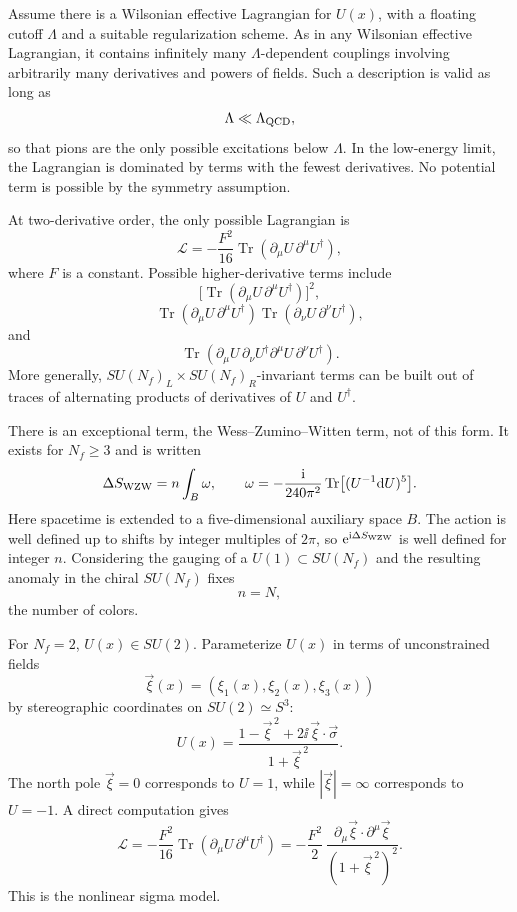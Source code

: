 Assume there is a Wilsonian effective Lagrangian for \(U(x)\), with a
floating cutoff \(\Lambda\) and a suitable regularization scheme.  As in
any Wilsonian effective Lagrangian, it contains infinitely many
\(\Lambda\)-dependent couplings involving arbitrarily many derivatives
and powers of fields.  Such a description is valid as long as
\[
  \Lambda\ll\Lambda_{\rm QCD},
\]
so that pions are the only possible excitations below \(\Lambda\).  In
the low-energy limit, the Lagrangian is dominated by terms with the
fewest derivatives.  No potential term is possible by the symmetry
assumption.

At two-derivative order, the only possible Lagrangian is
\[
  \mathcal L
  =
  -\frac{F^2}{16}
  \operatorname{Tr}(\partial_\mu U\,\partial^\mu U^\dagger),
\]
where \(F\) is a constant.  Possible higher-derivative terms include
\[
  \bigl[
    \operatorname{Tr}(\partial_\mu U\,\partial^\mu U^\dagger)
  \bigr]^2,
\]
\[
  \operatorname{Tr}(\partial_\mu U\,\partial^\mu U^\dagger)
  \operatorname{Tr}(\partial_\nu U\,\partial^\nu U^\dagger),
\]
and
\[
  \operatorname{Tr}(
    \partial_\mu U\,\partial_\nu U^\dagger
    \partial^\mu U\,\partial^\nu U^\dagger).
\]
More generally, \(SU(N_f)_L\times SU(N_f)_R\)-invariant terms can be
built out of traces of alternating products of derivatives of \(U\) and
\(U^\dagger\).

There is an exceptional term, the Wess--Zumino--Witten term, not of this
form.  It exists for \(N_f\ge3\) and is written
\[
  \Delta S_{\rm WZW}=n\int_B\omega,
  \qquad
  \omega=-\frac{\mathrm{i}}{240\pi^2}
  \operatorname{Tr}\bigl[(U^{-1}\mathrm{d} U)^5\bigr].
\]
Here spacetime is extended to a five-dimensional auxiliary space \(B\).
The action is well defined up to shifts by integer multiples of \(2\pi\),
so \(\mathrm{e}^{\mathrm{i}\Delta S_{\rm WZW}}\) is well defined for integer \(n\).
Considering the gauging of a \(U(1)\subset SU(N_f)\) and the resulting
anomaly in the chiral \(SU(N_f)\) fixes
\[
  n=N,
\]
the number of colors.

For \(N_f=2\), \(U(x)\in SU(2)\).  Parameterize \(U(x)\) in terms of
unconstrained fields
\[
  \vec\xi(x)=(\xi_1(x),\xi_2(x),\xi_3(x))
\]
by stereographic coordinates on \(SU(2)\simeq S^3\):
\[
  U(x)
  =
  \frac{1-\vec\xi^{\,2}+2\ii\,\vec\xi\cdot\vec\sigma}
       {1+\vec\xi^{\,2}}.
\]
The north pole \(\vec\xi=0\) corresponds to \(U=1\), while
\(|\vec\xi|=\infty\) corresponds to \(U=-1\).  A direct computation gives
\[
  \mathcal L
  =
  -\frac{F^2}{16}
  \operatorname{Tr}(\partial_\mu U\,\partial^\mu U^\dagger)
  =
  -\frac{F^2}{2}\,
  \frac{\partial_\mu\vec\xi\cdot\partial^\mu\vec\xi}
       {(1+\vec\xi^{\,2})^2}.
\]
This is the nonlinear sigma model.

